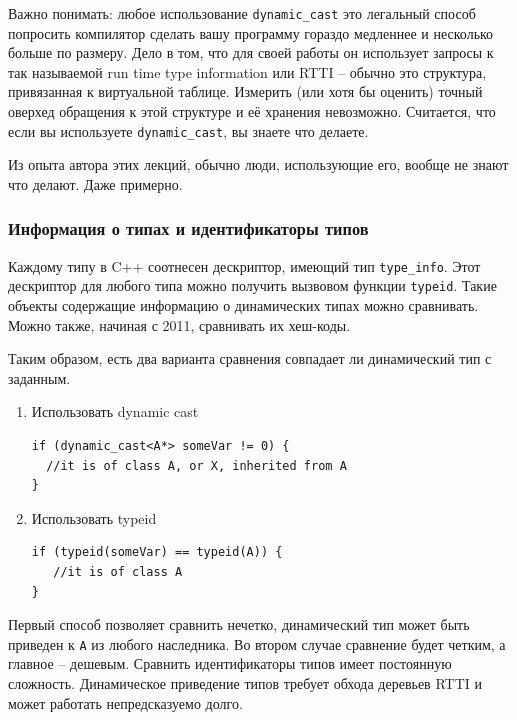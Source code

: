 \documentclass[a4paper,12pt,oneside]{article}
\begin{document}
Важно понимать: любое использование \lstinline!dynamic_cast! это легальный способ попросить компилятор сделать вашу программу гораздо медленнее и несколько больше по размеру. Дело в том, что для своей работы он использует запросы к так называемой run time type information или RTTI -- обычно это структура, привязанная к виртуальной таблице. Измерить (или хотя бы оценить) точный оверхед обращения к этой структуре и её хранения невозможно. Считается, что если вы используете \lstinline!dynamic_cast!, вы знаете что делаете.

Из опыта автора этих лекций, обычно люди, использующие его, вообще не знают что делают. Даже примерно.

\subsubsection{Информация о типах и идентификаторы типов}\label{TypeInfo}

Каждому типу в C++ соотнесен дескриптор, имеющий тип \lstinline!type_info!. Этот дескриптор для любого типа можно получить вызвовом функции \lstinline!typeid!. Такие объекты содержащие информацию о динамических типах можно сравнивать. Можно также, начиная с 2011, сравнивать их хеш-коды.

Таким образом, есть два варианта сравнения совпадает ли динамический тип с заданным.

\begin{enumerate}

\item Использовать dynamic cast

\begin{lstlisting}
if (dynamic_cast<A*> someVar != 0) { 
  //it is of class A, or X, inherited from A 
}
\end{lstlisting}

\item Использовать typeid

\begin{lstlisting}
if (typeid(someVar) == typeid(A)) {
   //it is of class A
}
\end{lstlisting}

\end{enumerate}

Первый способ позволяет сравнить нечетко, динамический тип может быть приведен к \lstinline!A! из любого наследника. Во втором случае сравнение будет четким, а главное -- дешевым. Сравнить идентификаторы типов имеет постоянную сложность. Динамическое приведение типов требует обхода деревьев RTTI и может работать непредсказуемо долго.
\end{document}
